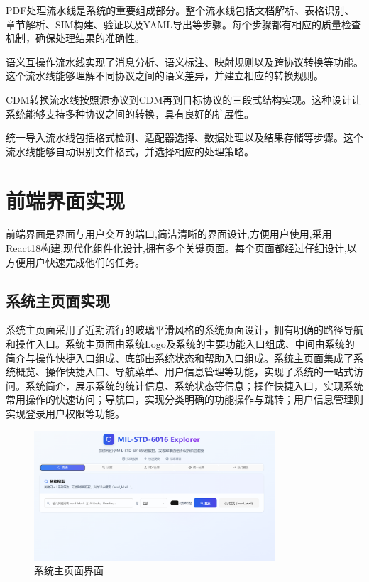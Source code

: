 PDF处理流水线是系统的重要组成部分。整个流水线包括文档解析、表格识别、章节解析、SIM构建、验证以及YAML导出等步骤。每个步骤都有相应的质量检查机制，确保处理结果的准确性。

语义互操作流水线实现了消息分析、语义标注、映射规则以及跨协议转换等功能。这个流水线能够理解不同协议之间的语义差异，并建立相应的转换规则。

CDM转换流水线按照源协议到CDM再到目标协议的三段式结构实现。这种设计让系统能够支持多种协议之间的转换，具有良好的扩展性。

统一导入流水线包括格式检测、适配器选择、数据处理以及结果存储等步骤。这个流水线能够自动识别文件格式，并选择相应的处理策略。


\section{前端界面实现}

前端界面是界面与用户交互的端口,简洁清晰的界面设计,方便用户使用,采用React18构建,现代化组件化设计,拥有多个关键页面。每个页面都经过仔细设计,以方便用户快速完成他们的任务。

\subsection{系统主页面实现}

系统主页面采用了近期流行的玻璃平滑风格的系统页面设计，拥有明确的路径导航和操作入口。系统主页面由系统Logo及系统的主要功能入口组成、中间由系统的简介与操作快捷入口组成、底部由系统状态和帮助入口组成。系统主页面集成了系统概览、操作快捷入口、导航菜单、用户信息管理等功能，实现了系统的一站式访问。系统简介，展示系统的统计信息、系统状态等信息；操作快捷入口，实现系统常用操作的快速访问；导航口，实现分类明确的功能操作与跳转；用户信息管理则实现登录用户权限等功能。

\begin{figure}[H]
\centering
\includegraphics[width=0.8\textwidth]{chapters/fig-0/front-homepage.png}
\caption{系统主页面界面}
\label{fig:frontend-homepage}
\end{figure}

